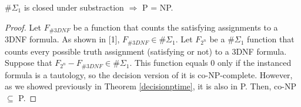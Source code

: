 \begin{theo}
$\#\Sigma_1$ is closed under substraction $\Rightarrow$ P = NP.
\end{theo}
\begin{proof}
Let $F_{\#3DNF}$ be a function that counts the satisfying assignments to a 3DNF formula. As shown in [1], $F_{\#3DNF} \in \#\Sigma_1$. Let $F_{2^n}$ be a $\#\Sigma_1$ function that counts every possible truth assignment (satisfying or not) to a 3DNF formula. Suppose that $F_{2^n}-F_{\#3DNF} \in \#\Sigma_1$. This function equals 0 only if the instanced formula is a tautology, so the decision version of it is co-NP-complete. However, as we showed previously in Theorem \ref{decisionptime}, it is also in P. Then, co-NP $\subseteq$ P.
\end{proof}